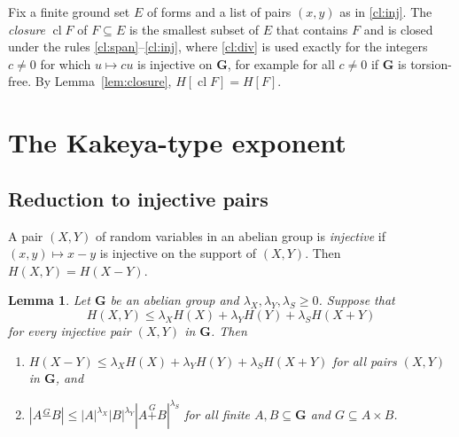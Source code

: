 \documentclass[11pt]{amsart}
\newtheorem{lemma}[theorem]{Lemma}
\theoremstyle{definition}
\theoremstyle{remark}
\numberwithin{equation}{section}
\newcommand{\GG}{\mathbf{G}}
\newcommand{\gp}{\mathbin{\overset{G}{+}}}
\newcommand{\gm}{\mathbin{\overset{G}{-}}}
\newcommand{\cl}{\operatorname{cl}}
\begin{document}
Fix a finite ground set $E$ of forms and a list of pairs $(x,y)$ as in \ref{cl:inj}. The \emph{closure} $\cl F$ of $F\subseteq E$ is the smallest subset of $E$ that contains $F$ and is closed under the rules \ref{cl:span}--\ref{cl:inj}, where \ref{cl:div} is used exactly for the integers $c\ne0$ for which $u\mapsto cu$ is injective on $\GG$, for example for all $c\ne0$ if $\GG$ is torsion-free. By Lemma~\ref{lem:closure}, $H[\cl F]=H[F]$.

\section{The Kakeya-type exponent}\label{sec:3b}

\subsection{Reduction to injective pairs}
A pair $(X,Y)$ of random variables in an abelian group is \emph{injective} if $(x,y)\mapsto x-y$ is injective on the support of $(X,Y)$. Then $H(X,Y)=H(X-Y)$.

\begin{lemma}\label{lem:reduction}
Let $\GG$ be an abelian group and $\lambda_X,\lambda_Y,\lambda_S\ge0$. Suppose that
\begin{equation}\label{eq:inj}
H(X,Y)\le\lambda_XH(X)+\lambda_YH(Y)+\lambda_SH(X+Y)
\end{equation}
for every injective pair $(X,Y)$ in $\GG$. Then
\begin{enumerate}[label=\textup{(\alph*)}]
\item\label{red:ent} $H(X-Y)\le\lambda_XH(X)+\lambda_YH(Y)+\lambda_SH(X+Y)$ for all pairs $(X,Y)$ in $\GG$, and
\item\label{red:set} $|A\gm B|\le|A|^{\lambda_X}|B|^{\lambda_Y}|A\gp B|^{\lambda_S}$ for all finite $A,B\subseteq\GG$ and $G\subseteq A\times B$.
\end{enumerate}
\end{lemma}
\end{document}
